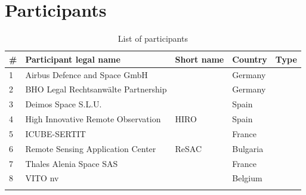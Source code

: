\section{Participants}
\begin{longtable}[H]{p{1cm} p{5.7cm} p{2cm} p{2cm} p{2cm}}
	\toprule[2pt]
	
	\textbf{\#} & \textbf{Participant legal name} & \textbf{Short name} & \textbf{Country} & \textbf{Type} \\
	
	\midrule[1.5pt] 
	\endhead
	
	1 & Airbus Defence and Space GmbH &  & Germany &  \vspace{0.2cm} \\	\midrule
	
	2 & BHO Legal Rechtsanwälte Partnership &  & Germany &  \vspace{0.2cm} \\	\midrule
	
	3 & Deimos Space S.L.U. &  & Spain &  \vspace{0.2cm} \\ \midrule
	
	4 & High Innovative Remote Observation & HIRO & Spain &  \vspace{0.2cm} \\ \midrule
	
	5 & ICUBE-SERTIT &  & France &  \vspace{0.2cm} \\ \midrule
	
	6 & Remote Sensing Application Center & ReSAC & Bulgaria &  \vspace{0.2cm} \\ \midrule
	
	7 & Thales Alenia Space SAS &  & France &  \vspace{0.2cm} \\ \midrule
	
	8 & VITO nv &  & Belgium &  \vspace{0.2cm} \\ \bottomrule[2pt]
	
	\caption{List of participants}
\end{longtable}

